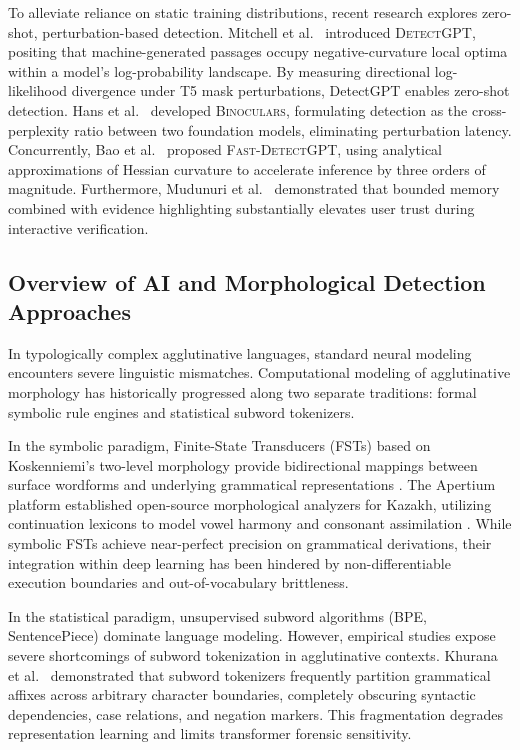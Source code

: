 To alleviate reliance on static training distributions, recent research explores zero-shot, perturbation-based detection. Mitchell et al.\ \cite{mitchell2023detectgpt} introduced \textsc{DetectGPT}, positing that machine-generated passages occupy negative-curvature local optima within a model's log-probability landscape. By measuring directional log-likelihood divergence under T5 mask perturbations, DetectGPT enables zero-shot detection. Hans et al.\ \cite{hans2024binoculars} developed \textsc{Binoculars}, formulating detection as the cross-perplexity ratio between two foundation models, eliminating perturbation latency. Concurrently, Bao et al.\ \cite{bao2024fastdetectgpt} proposed \textsc{Fast-DetectGPT}, using analytical approximations of Hessian curvature to accelerate inference by three orders of magnitude. Furthermore, Mudunuri et al.\ \cite{mudunuri-etal-2026-bounded} demonstrated that bounded memory combined with evidence highlighting substantially elevates user trust during interactive verification.

\subsection{Overview of AI and Morphological Detection Approaches}
\label{sec:overview_ai_morpho}

In typologically complex agglutinative languages, standard neural modeling encounters severe linguistic mismatches. Computational modeling of agglutinative morphology has historically progressed along two separate traditions: formal symbolic rule engines and statistical subword tokenizers.

In the symbolic paradigm, Finite-State Transducers (FSTs) based on Koskenniemi's two-level morphology provide bidirectional mappings between surface wordforms and underlying grammatical representations \cite{tyers2012free, khoshhal2020kazakh}. The Apertium platform established open-source morphological analyzers for Kazakh, utilizing continuation lexicons to model vowel harmony and consonant assimilation \cite{tyers2012free, khoshhal2020kazakh}. While symbolic FSTs achieve near-perfect precision on grammatical derivations, their integration within deep learning has been hindered by non-differentiable execution boundaries and out-of-vocabulary brittleness.

In the statistical paradigm, unsupervised subword algorithms (BPE, SentencePiece) dominate language modeling. However, empirical studies expose severe shortcomings of subword tokenization in agglutinative contexts. Khurana et al.\ \cite{khurana2024subwords} demonstrated that subword tokenizers frequently partition grammatical affixes across arbitrary character boundaries, completely obscuring syntactic dependencies, case relations, and negation markers. This fragmentation degrades representation learning and limits transformer forensic sensitivity.

